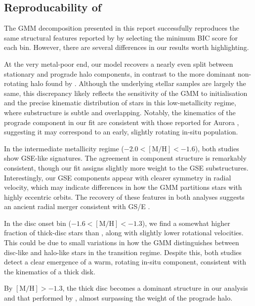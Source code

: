 \documentclass[a4paper,12pt]{article}
\begin{document}
\subsection{Reproducability of \citet{zhang2024existencemetalpoordiscmilky}}

The GMM decomposition presented in this report successfully reproduces the same structural features reported 
by \citet{zhang2024existencemetalpoordiscmilky} by selecting the minimum BIC score for each bin. However, there 
are several differences in our results worth highlighting.

At the very metal-poor end, our model recovers a nearly even split between stationary and prograde halo 
components, in contrast to the more dominant non-rotating halo found by \citet{zhang2024existencemetalpoordiscmilky}. 
Although the underlying stellar samples are largely the same, this discrepancy likely reflects the 
sensitivity of the GMM to initialisation and the precise kinematic distribution of stars in this 
low-metallicity regime, where substructure is subtle and overlapping. Notably, the kinematics of the 
prograde component in our fit are consistent with those reported for Aurora \citep{Belokurov2022}, 
suggesting it may correspond to an early, slightly rotating in-situ population.

In the intermediate metallicity regime ($-2.0 < \mathrm{[M/H]} < -1.6$), both studies show GSE-like 
signatures. The agreement in component structure is remarkably consistent, though our fit assigns slightly 
more weight to the GSE substructures. Interestingly, our GSE components appear with clearer symmetry in radial 
velocity, which may indicate differences in how the GMM partitions stars with highly eccentric orbits. 
The recovery of these features in both analyses suggests an ancient radial merger consistent with GS/E \citep{Belokurov2020}.

In the disc onset bin ($-1.6 < \mathrm{[M/H]} < -1.3$), we find a somewhat higher fraction of 
thick-disc stars than \citet{zhang2024existencemetalpoordiscmilky}, along with slightly lower rotational 
velocities. This could be due to small variations in how the GMM distinguishes between disc-like and 
halo-like stars in the transition regime. Despite this, both studies detect a clear emergence of a warm, 
rotating in-situ component, consistent with the kinematics of a thick disk.

By $[\mathrm{M/H}] > -1.3$, the thick disc becomes a dominant structure in our analysis and that performed
by \citet{zhang2024existencemetalpoordiscmilky}, almost surpassing the weight of the prograde halo.
\end{document}
